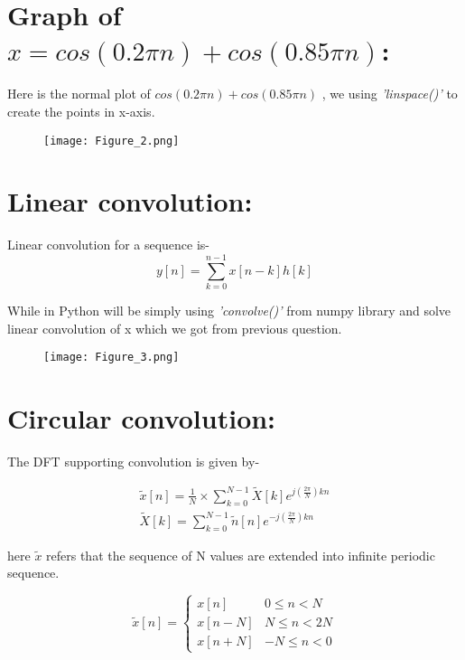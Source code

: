 \documentclass[12pt]{article}
\begin{document}
\newpage
\section*{Graph of {\boldmath $x = cos(0.2\pi n) + cos(0.85 \pi n)$}:}

Here is the normal plot of $cos(0.2\pi n) + cos(0.85 \pi n)$ , we using \textit{'linspace()'} to create the points in x-axis.
\begin{figure}[h!]
\centering
\texttt{[image: Figure\_2.png]}
\end{figure}
\section*{Linear convolution:}
Linear convolution for a sequence is-
\begin{equation}
    y[n] = \sum_{k=0}^{n-1} x[n-k]h[k]
\end{equation}

While in Python will be simply using \textit{'convolve()'} from numpy library and solve linear convolution of x which we got from previous question.
\begin{figure}[h!]
\centering
\texttt{[image: Figure\_3.png]}
\label{fig:exemplo}
\end{figure}

\newpage
\section*{Circular convolution: }

The DFT supporting convolution is given by-

\begin{equation}
  \begin{aligned}
    \tilde{x}[n] = \frac{1}{N} \times \sum_{k=0}^{N-1} \tilde{X}[k]e^{j(\frac{2\pi}{N})kn}\\
    \tilde{X}[k]= \sum_{k=0}^{N-1} \tilde{n}[n]e^{-j(\frac{2\pi}{N})kn}
  \end{aligned}
\end{equation}

here $\tilde{x}$ refers that the sequence of N values are extended into infinite periodic sequence.

  \begin{equation}
    \tilde{x}[n]=
    \begin{cases}
      x[n]    &   0 \le n < N\\
      x[n-N]  &   N \le n < 2N\\
      x[n+N]  & -N \le n < 0
    \end{cases}
  \end{equation}
\end{document}
